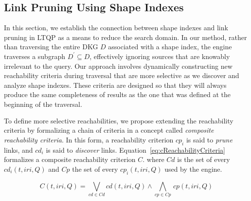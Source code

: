 \subsection{Link Pruning Using Shape Indexes}\label{sec:sourceSelection}

In this section, we establish the connection between shape indexes and link pruning in LTQP as a means to reduce the search domain.
In our method, rather than traversing the entire DKG $D$ associated with a shape index, the engine traverses a subgraph $D^{\prime} \subseteq D$, effectively ignoring sources that are knowably irrelevant to the query.
Our approach involves dynamically constructing new reachability criteria during traversal that are more selective as we discover and analyze shape indexes.
These criteria are designed so that they will always produce the same completeness of results as the one that was defined at the beginning of the traversal.

To define more selective reachabilities, we propose extending the reachability criteria by formalizing a chain of criteria in a concept called \emph{composite reachability criteria}.
In this form, a reachability criterion $cp_i$ is said to \emph{prune} links, and $cd_i$ is said to \emph{discover} links.
Equation~\ref{eq:cReachabilityCriteria} formalizes a composite reachability criterion $C$.
where $Cd$ is the set of every $cd_i(t, iri, Q)$ and $Cp$ the set of every $cp_i(t, iri, Q)$ used by the engine.

\begin{equation}\label{eq:cReachabilityCriteria}
   C(t, iri, Q) = \bigvee_{cd \in Cd} cd(t, iri, Q) \mathrel{\land} \bigwedge_{cp \in Cp} \, cp(t, iri, Q)
\end{equation}

